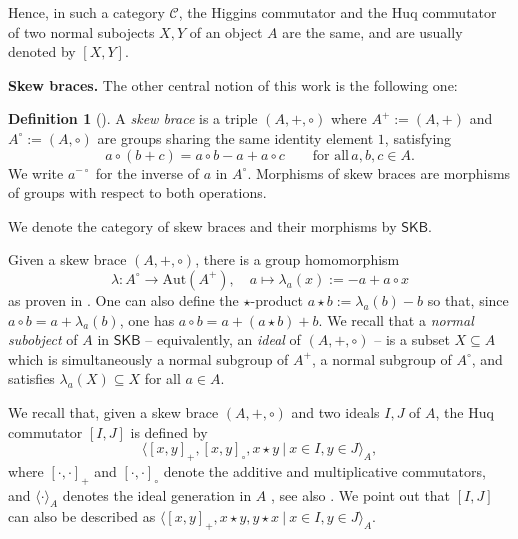 \documentclass{amsart}
\theoremstyle{definition}
\newtheorem{definition}[theorem]{Definition}
\newtheorem{remark}[theorem]{Remark}
\newcommand{\lam}{\lambda}
\newcommand{\SKB}{\mathsf{SKB}}
\begin{document}
Hence, in such a category $\mathcal{C}$, the Higgins commutator and the Huq commutator of two normal subojects $X,Y$ of an object $A$ are the same, and are usually denoted by $[X,Y]$. \medskip

\noindent\textbf{Skew braces.} The other central notion of this work is the following one:
\begin{definition}[{\cite[Definition 1.1]{GV}}]
 A \emph{skew brace} is a triple $(A,+,\circ)$ where $A^{+}:=(A,+)$ and $A^{\circ}:=(A,\circ)$
 are groups sharing the same identity element $1$, satisfying
 \begin{equation}\label{eq:brace}
   a \circ (b + c) = a \circ b- a + a \circ c
   \qquad \text{for all}\, a,b,c \in A.
 \end{equation}
We write $a^{-\circ}$ for the inverse of $a$ in $A^{\circ}$. Morphisms of skew braces are morphisms of groups with respect to both operations. 

We denote the category of skew braces and their morphisms by $\SKB$.
\end{definition}

Given a skew brace $(A,+,\circ)$, there is a group homomorphism
 \[
\lambda:A^{\circ}\to\mathrm{Aut}(A^{+}),\quad a\mapsto\lam_a(x) := -a+ a \circ x
\]
as proven in \cite[Corollary 1.10]{GV}. %
One can also define the $\star$-product $a \star b := \lam_a(b)- b$ so that, since $a\circ b=a+\lambda_a(b)$, one has $a \circ b = a + (a \star b) + b$. We recall that a \emph{normal subobject} of $A$ in $\SKB$ -- equivalently, an
 \emph{ideal} of $(A,+,\circ)$ -- is a subset $X \subseteq A$ which is simultaneously
 a normal subgroup of $A^{+}$, a normal subgroup of $A^{\circ}$, and satisfies
 $\lam_a(X) \subseteq X$ for all $a \in A$. 

We recall that, given a skew brace $(A,+,\circ)$ and two ideals $I,J$ of $A$, the Huq commutator $[I,J]$ is defined by
\[
\langle[x,y]_{+},[x,y]_{\circ}, x\star y\ |\ x\in I, y\in J\rangle_{A},
\]
where $[\cdot,\cdot]_{+}$ and $[\cdot,\cdot]_{\circ}$ denote the additive and multiplicative commutators, and $\langle\cdot \rangle_{A}$ denotes the ideal generation in $A$ \cite{BFP2023}, see also \cite{GLV,Tsang}. We point out that $[I,J]$ can also be described as $\langle[x,y]_{+},x\star y,y\star x\ |\ x\in I, y\in J\rangle_{A}$.
\end{document}
